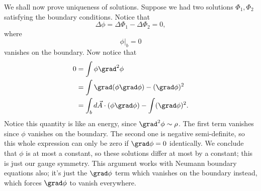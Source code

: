 We shall now prove uniqueness of solutions. Suppose we had two solutions $\Phi_1,\Phi_2$ satisfying the boundary conditions. Notice that
\begin{equation}
    \Delta \phi = \Delta \Phi_1 - \Delta \Phi_2 =0,
\end{equation}
where
\begin{equation}
    \phi|_b =0
\end{equation}
vanishes on the boundary. Now notice that
\begin{align}
    0&=\int \phi \grad^2 \phi\\
        &= \int \grad(\phi \grad \phi) - (\grad \phi)^2\\
        &= \int_b d\vec A \cdot (\phi \grad \phi) - \int(\grad \phi)^2.
\end{align} 
Notice this quantity is like an energy, since $\grad^2 \phi \sim \rho$.
The first term vanishes since $\phi$ vanishes on the boundary. The second one is negative semi-definite, so this whole expression can only be zero if $\grad \phi=0$ identically. We conclude that $\phi$ is at most a constant, so these solutions differ at most by a constant; this is just our gauge symmetry. This argument works with Neumann boundary equations also; it's just the $\grad \phi$ term which vanishes on the boundary instead, which forces $\grad \phi$ to vanish everywhere.

